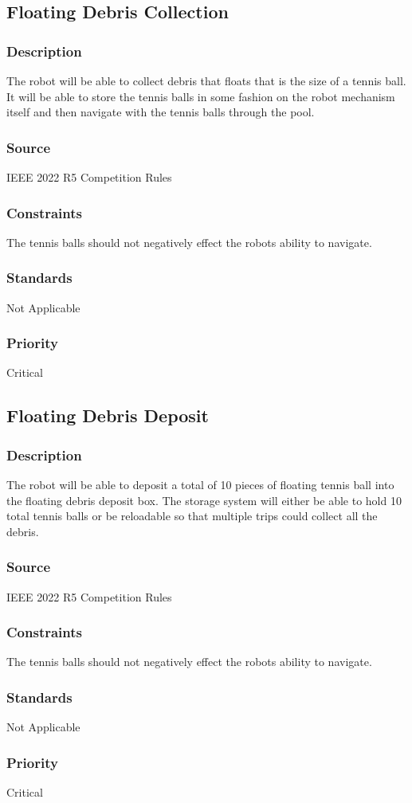 \subsection{Floating Debris Collection}
\subsubsection{Description}
The robot will be able to collect debris that floats that is the size of a tennis ball. It will be able to store the tennis balls in some fashion on the robot mechanism itself and then navigate with the tennis balls through the pool.
\subsubsection{Source}
IEEE 2022 R5 Competition Rules
\subsubsection{Constraints}
The tennis balls should not negatively effect the robots ability to navigate.
\subsubsection{Standards}
Not Applicable
\subsubsection{Priority}
Critical

\subsection{Floating Debris Deposit}
\subsubsection{Description}
The robot will be able to deposit a total of 10 pieces of floating tennis ball into the floating debris deposit box. The storage system will either be able to hold 10 total tennis balls or be reloadable so that multiple trips could collect all the debris.
\subsubsection{Source}
IEEE 2022 R5 Competition Rules
\subsubsection{Constraints}
The tennis balls should not negatively effect the robots ability to navigate.
\subsubsection{Standards}
Not Applicable
\subsubsection{Priority}
Critical